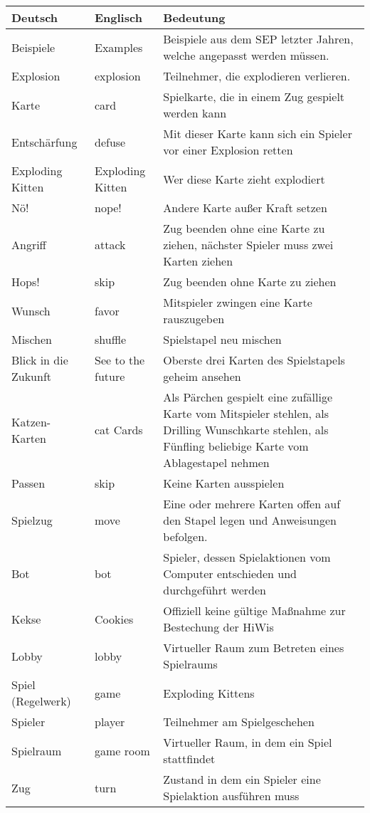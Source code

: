 \begin{center}
	\begin{longtable}{p{} p{} p{}}
		\textbf{Deutsch} & \textbf{Englisch} & \textbf{Bedeutung} \\
		\hline \hline \endhead
		Beispiele & Examples & Beispiele aus dem SEP letzter Jahren, welche angepasst werden müssen.\\
		Explosion & explosion & Teilnehmer, die explodieren verlieren. \\    
		Karte & card & Spielkarte, die in einem Zug gespielt werden kann\\
		Entschärfung & defuse & Mit dieser Karte kann sich ein Spieler vor einer Explosion retten\\
		Exploding Kitten & Exploding Kitten & Wer diese Karte zieht explodiert\\
		Nö! & nope! & Andere Karte außer Kraft setzen\\
		Angriff & attack & Zug beenden ohne eine Karte zu ziehen, nächster Spieler muss zwei Karten ziehen\\
		Hops! & skip & Zug beenden ohne Karte zu ziehen\\
		Wunsch & favor & Mitspieler zwingen eine Karte rauszugeben\\
		Mischen & shuffle & Spielstapel neu mischen\\
		Blick in die Zukunft & See to the future & Oberste drei Karten des Spielstapels geheim ansehen\\
		Katzen-Karten & cat Cards & Als Pärchen gespielt eine zufällige Karte vom Mitspieler stehlen, als Drilling Wunschkarte stehlen, als Fünfling beliebige Karte vom Ablagestapel nehmen\\
		
		Passen & skip & Keine Karten ausspielen\\
		Spielzug & move & Eine oder mehrere Karten offen auf den Stapel legen und Anweisungen befolgen. \\
		
		Bot & bot & Spieler, dessen Spielaktionen vom Computer entschieden und durchgeführt werden\\
		Kekse & Cookies & Offiziell keine gültige Maßnahme zur Bestechung der HiWis\\          
		Lobby & lobby & Virtueller Raum zum Betreten eines Spielraums\\	
		Spiel (Regelwerk) & game & Exploding Kittens \\
		Spieler & player & Teilnehmer am Spielgeschehen\\
		Spielraum & game room & Virtueller Raum, in dem ein Spiel stattfindet\\
		Zug & turn & Zustand in dem ein Spieler eine Spielaktion ausführen muss\\
	\end{longtable}
\end{center}

